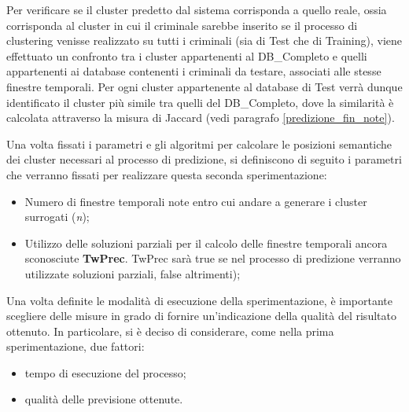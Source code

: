 Per verificare se il cluster predetto dal sistema corrisponda a quello reale, ossia corrisponda al cluster in cui il criminale sarebbe inserito se il processo di clustering venisse realizzato su tutti i criminali (sia di Test che di Training), viene effettuato un confronto tra i cluster appartenenti al DB\_Completo e quelli appartenenti ai database contenenti i criminali da testare, associati alle stesse finestre temporali. Per ogni cluster appartenente al database di Test verrà dunque identificato il cluster più simile tra quelli del DB\_Completo, 
dove la similarità è calcolata attraverso la misura di Jaccard (vedi paragrafo \ref{predizione_fin_note}).  
 

Una volta fissati i parametri e gli algoritmi per calcolare le posizioni semantiche dei cluster necessari al processo di predizione, si definiscono di seguito i parametri che verranno fissati per realizzare questa seconda sperimentazione:
\begin{itemize}
	\item Numero di finestre temporali note entro cui andare a generare i cluster surrogati (\textit{n});
	\item Utilizzo delle soluzioni parziali per il calcolo delle finestre temporali ancora sconosciute \textbf{TwPrec}. TwPrec sarà true se nel processo di predizione verranno utilizzate soluzioni parziali, false altrimenti);
\end{itemize}

Una volta definite le modalità di esecuzione della sperimentazione, è importante scegliere delle misure in grado di fornire un'indicazione della qualità del risultato ottenuto. In particolare, si è deciso di considerare, come nella prima sperimentazione, due fattori:
\begin{itemize}
	\item tempo di esecuzione del processo;
	\item qualità delle previsione ottenute.
\end{itemize}

